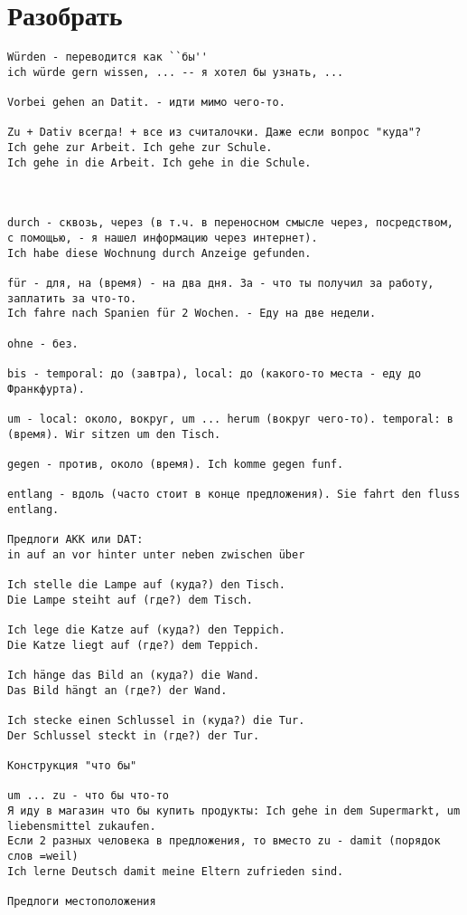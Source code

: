 \documentclass[12pt,a4paper]{report}
\begin{document}
\chapter{Разобрать}
\begin{verbatim}
Würden - переводится как ``бы''
ich würde gern wissen, ... -- я хотел бы узнать, ...

Vorbei gehen an Datit. - идти мимо чего-то.

Zu + Dativ всегда! + все из считалочки. Даже если вопрос "куда"? 
Ich gehe zur Arbeit. Ich gehe zur Schule.
Ich gehe in die Arbeit. Ich gehe in die Schule.



durch - сквозь, через (в т.ч. в переносном смысле через, посредством, с помощью, - я нашел информацию через интернет).
Ich habe diese Wochnung durch Anzeige gefunden.

für - для, на (время) - на два дня. За - что ты получил за работу, заплатить за что-то.
Ich fahre nach Spanien für 2 Wochen. - Еду на две недели.

ohne - без.

bis - temporal: до (завтра), local: до (какого-то места - еду до Франкфурта).

um - local: около, вокруг, um ... herum (вокруг чего-то). temporal: в (время). Wir sitzen um den Tisch.

gegen - против, около (время). Ich komme gegen funf.

entlang - вдоль (часто стоит в конце предложения). Sie fahrt den fluss entlang.

Предлоги AKK или DAT:
in auf an vor hinter unter neben zwischen über

Ich stelle die Lampe auf (куда?) den Tisch.
Die Lampe steiht auf (где?) dem Tisch.

Ich lege die Katze auf (куда?) den Teppich.
Die Katze liegt auf (где?) dem Teppich.

Ich hänge das Bild an (куда?) die Wand.
Das Bild hängt an (где?) der Wand.

Ich stecke einen Schlussel in (куда?) die Tur.
Der Schlussel steckt in (где?) der Tur.

Конструкция "что бы"

um ... zu - что бы что-то
Я иду в магазин что бы купить продукты: Ich gehe in dem Supermarkt, um liebensmittel zukaufen.
Если 2 разных человека в предложения, то вместо zu - damit (порядок слов =weil)
Ich lerne Deutsch damit meine Eltern zufrieden sind.

Предлоги местоположения


\end{verbatim}
\end{document}
